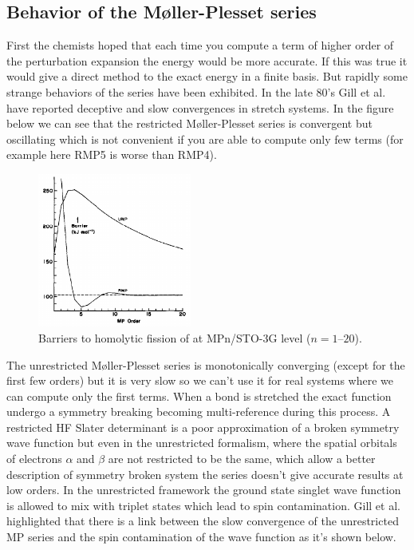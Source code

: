 \documentclass[11pt,a4paper]{article}
\begin{document}
\subsection{Behavior of the M{\o}ller-Plesset series}

First the chemists hoped that each time you compute a term of higher order of the perturbation expansion the energy would be more accurate. If this was true it would give a direct method to the exact energy in a finite basis. But rapidly some strange behaviors of the series have been exhibited. In the late 80's Gill et al. have reported deceptive and slow convergences in stretch systems. In the figure below we can see that the restricted M{\o}ller-Plesset series is convergent but oscillating which is not convenient if you are able to compute only few terms (for example here RMP5 is worse than RMP4). 

\begin{figure}[h!]
    \centering
    \includegraphics[width=0.45\textwidth]{gill1986.png}
    \caption{\centering Barriers to homolytic fission of  at MPn/STO-3G level ($n = 1$--$20$).}
    \label{fig:my_label}
\end{figure}

The unrestricted M{\o}ller-Plesset series is monotonically converging (except for the first few orders) but it is very slow so we can't use it for real systems where we can compute only the first terms. When a bond is stretched the exact function undergo a symmetry breaking becoming multi-reference during this process. A restricted HF Slater determinant is a poor approximation of a broken symmetry wave function but even in the unrestricted formalism, where the spatial orbitals of electrons $\alpha$ and $\beta$ are not restricted to be the same, which allow a better description of symmetry broken system the series doesn't give accurate results at low orders. In the unrestricted framework the ground state singlet wave function is allowed to mix with triplet states which lead to spin contamination. Gill et al. highlighted that there is a link between the slow convergence of the unrestricted MP series and the spin contamination of the wave function as it's shown below.
\end{document}
